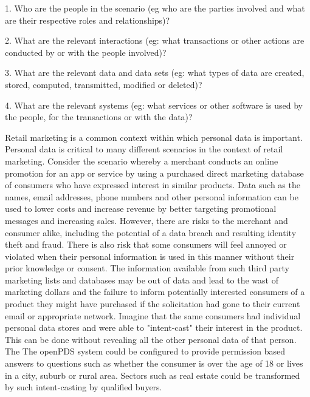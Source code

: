 1. Who are the people in the scenario (eg who are the parties involved and what are their respective roles and relationships)? 
 
2. What are the relevant interactions (eg: what transactions or other actions are conducted by or with the people involved)?

3. What are the relevant data and data sets (eg: what types of data are created, stored, computed, transmitted, modified or deleted)?

4. What are the relevant systems (eg: what services or other software is used by the people, for the transactions or with the data)? 

Retail marketing is a common context within which personal data is important.  Personal data is critical to many different scenarios in the context of retail marketing.  Consider the scenario whereby a merchant conducts an online promotion for an app or service by using a purchased direct marketing database of consumers who have expressed interest in similar products.  Data such as the names, email addresses, phone numbers and other personal information can be used to lower costs and increase revenue by better targeting promotional messages and increasing sales.  However, there are risks to the merchant and consumer alike, including the potential of a data breach and resulting identity theft and fraud.  There is also risk that some consumers will feel annoyed or violated when their personal information is used in this manner without their prior knowledge or consent. The information available from such third party marketing lists and databases may be out of data and lead to the wast of marketing dollars and the failure to inform potentially interested consumers of a product they might have purchased if the solicitation had gone to their current email or appropriate network.  Imagine that the same consumers had individual personal data stores and were able to "intent-cast" their interest in the product. This can be done without revealing all the other personal data of that person. The  The openPDS system could be configured to provide permission based answers to questions such as whether the consumer is over the age of 18 or lives in a city, suburb or rural area.  Sectors such as real estate could be transformed by such intent-casting by qualified buyers.   

